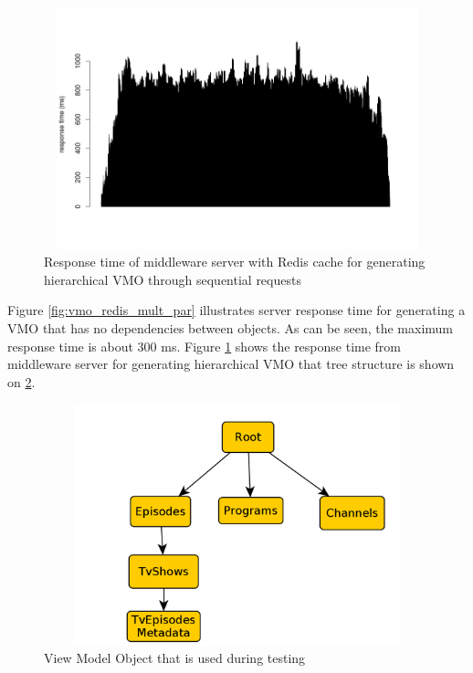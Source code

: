 \begin{figure}[h!]
    \centering
    \includegraphics[width=15cm,height=7cm,keepaspectratio]{images/vmo_redis_mult_seq.png}
    \caption{Response time of middleware server with Redis cache for generating hierarchical VMO through sequential requests}
    \label{fig:vmo_redis_mult_seq}
\end{figure}

Figure \ref{fig:vmo_redis_mult_par} illustrates server response time for generating a VMO that has no dependencies between objects. As can be seen, the maximum response time is about 300 ms. Figure \ref{fig:vmo_redis_mult_seq} shows the response time from middleware server for generating hierarchical VMO that tree structure is shown on \ref{fig:vmo_test_example}. 

\begin{figure}[h!]
    \centering
    \includegraphics[width=15cm,height=7cm,keepaspectratio]{images/vmo_test_example.png}
    \caption{View Model Object that is used during testing}
    \label{fig:vmo_test_example}
\end{figure}


